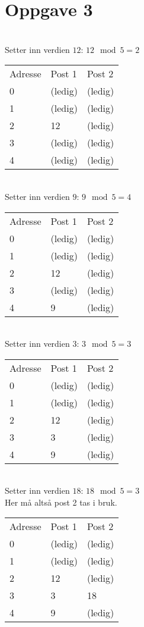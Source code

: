 \documentclass[a4paper, 12pt] {article}
\begin{document}
\newpage
\section{Oppgave 3}
~\\
Setter inn verdien $12$: $12 \mod 5 = 2$\\
\begin{tabular}{|l|l|l|}
    \hline
    Adresse & Post 1 & Post 2 \\
    0       & (ledig)& (ledig)\\
    1       & (ledig)& (ledig)\\
    2       & 12     & (ledig)\\
    3       & (ledig)& (ledig)\\
    4       & (ledig)& (ledig)\\ \hline
\end{tabular}

~\\
Setter inn verdien $9$: $9 \mod 5 = 4$\\
\begin{tabular}{|l|l|l|}
    \hline
    Adresse & Post 1 & Post 2 \\
    0       & (ledig)& (ledig)\\
    1       & (ledig)& (ledig)\\
    2       & 12     & (ledig)\\
    3       & (ledig)& (ledig)\\
    4       & 9      & (ledig)\\ \hline
\end{tabular}

~\\
Setter inn verdien $3$: $3 \mod 5 = 3$\\
\begin{tabular}{|l|l|l|}
    \hline
    Adresse & Post 1 & Post 2 \\
    0       & (ledig)& (ledig)\\
    1       & (ledig)& (ledig)\\
    2       & 12     & (ledig)\\
    3       & 3      & (ledig)\\
    4       & 9      & (ledig)\\ \hline
\end{tabular}

~\\
Setter inn verdien $18$: $18 \mod 5 = 3$\\
Her må altså post 2 tas i bruk.\\
\begin{tabular}{|l|l|l|}
    \hline
    Adresse & Post 1 & Post 2 \\
    0       & (ledig)& (ledig)\\
    1       & (ledig)& (ledig)\\
    2       & 12     & (ledig)\\
    3       & 3      & 18      \\
    4       & 9      & (ledig)\\ \hline
\end{tabular}
\end{document}
